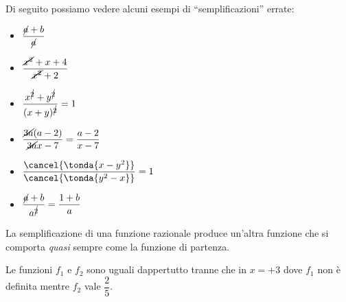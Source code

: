 
Di seguito possiamo vedere alcuni esempi di ``semplificazioni'' errate:
\begin{htmulticols}{3}
\begin{itemize}
\item \(\dfrac{\cancel{a}+b}{\cancel{a}}\)
\item \(\dfrac{\cancel{x^2}+x+4}{\cancel{x^2}+2}\) 
\item \(\dfrac{x^{\cancel{2}}+y^{\cancel{2}}}{(x+y)^{\cancel{2}}}=1\) 
\item \(\dfrac{\cancel{3a}(a-2)}{\cancel{3a}x-7}=\dfrac{a-2}{x-7}\) 
\item \(\dfrac{\cancel{ \tonda{x-y^2}}}
            {\cancel{ \tonda{y^2-x}}}=1\)
\item \(\dfrac{\cancel{a}+b}{a^{\cancel{2}}}=\dfrac{1+b}{a}\)
\end{itemize}
\end{htmulticols}

La semplificazione di una funzione razionale produce un'altra funzione che si 
comporta \emph{quasi} sempre come la funzione di partenza.


Le funzioni \(f_1\) e \(f_2\) sono uguali dappertutto tranne che in \(x=+3\) 
dove \(f_1\) non è definita mentre \(f_2\) vale \(\dfrac{2}{5}\).

